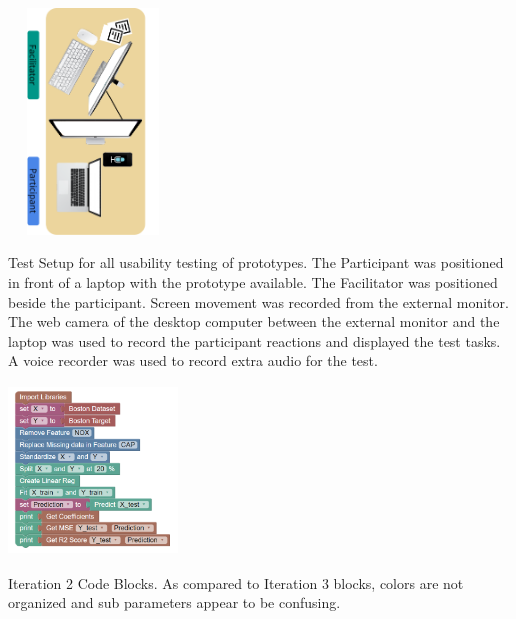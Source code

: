 \documentclass{sigchi-ext}
\begin{document}
\begin{marginfigure}[-45pc]
\begin{minipage}{\marginparwidth}
     \centering
    \includegraphics[width=4.5cm,height=6cm]{figures/setup.png}
    \caption{Test Setup for all usability testing of prototypes. The Participant was positioned in front of a laptop with the prototype available. The Facilitator was positioned beside the participant. Screen movement was recorded from the external monitor. The web camera of the desktop computer between the external monitor and the laptop was used to record the participant reactions and displayed the test tasks. A voice recorder was used to record extra audio for the test.}
    \label{fig:setup}
    \end{minipage}
\end{marginfigure}
\begin{marginfigure}[-8pc]
\begin{minipage}{\marginparwidth}
     \centering
    \includegraphics[width=4.5cm,height=4.5cm]{figures/IT2.png}
    \caption{Iteration 2 Code Blocks. As compared to Iteration 3 blocks, colors are not organized and sub parameters appear to be confusing.}
    \label{fig:IT2_Blocks}
    \end{minipage}
\end{marginfigure}
\end{document}

